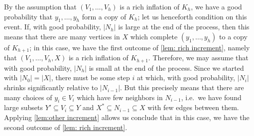 \documentclass{aic}
\theoremstyle{plain}
\theoremstyle{remark}
\newcommand\ab[1]{\lvert #1 \rvert}
\begin{document}
By the assumption that $(V_1,\dots,V_h)$ is a rich inflation of $K_h$, we have a good probability that $y_1,\dots,y_h$ form a copy of $K_h$; let us henceforth condition on this event. If, with good probability, $\ab{N_h}$ is large at the end of the process, then this means that there are many vertices in $X$ which complete $(y_1,\dots,y_h)$ to a copy of $K_{h+1}$; in this case, we have the first outcome of \cref{lem: rich increment}, namely that $(V_1,\dots,V_h,X)$ is a rich inflation of $K_{h+1}$. Therefore, we may assume that with good probability, $\ab{N_h}$ is small at the end of the process. Since we started with $\ab{N_0}=\ab X$, there must be some step $i$ at which, with good probability, $\ab{N_i}$ shrinks significantly relative to $\ab{N_{i-1}}$. But this precisely means that there are many choices of $y_i \in V_i$ which have few neighbors in $N_{i-1}$, i.e.\ we have found large subsets $Y' \subseteq V_i\subseteq Y$ and $X^* \subseteq N_{i-1}\subseteq X$ with few edges between them. Applying \cref{lem:other increment} allows us conclude that in this case, we have the second outcome of \cref{lem: rich increment}.
\end{document}

